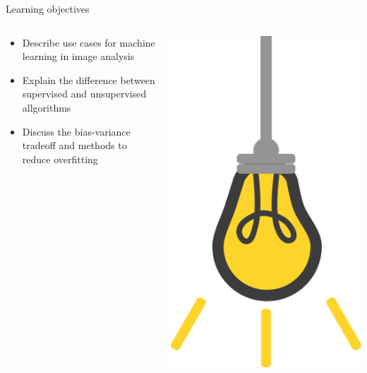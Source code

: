 \documentclass[9pt, aspectratio=169]{beamer}
\begin{document}
\begin{frame}
    {Learning objectives}
    \begin{columns}
        \begin{column}{0.8\textwidth}
            \begin{itemize}
                \item Describe use cases for machine learning in image analysis
                \item Explain the difference between supervised and unsupervised allgorithms
                \item Discuss the bias-variance tradeoff and methods to reduce overfitting
            \end{itemize}
        \end{column}
        \begin{column}{0.2\textwidth}
            \includegraphics[angle=-30, origin=tr, width=1.5\textwidth]{lightbulb.png}
        \end{column}
    \end{columns}
\end{frame}
\end{document}
